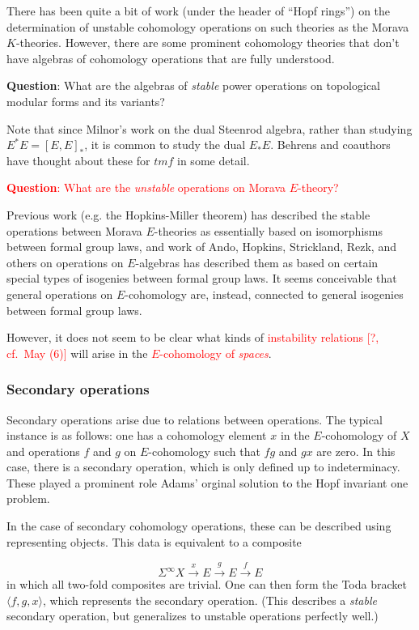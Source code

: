 \documentclass[12pt,titlepage]{article}
\newcommand{\rd}[1]{{\textcolor{red}{#1}}}
\theoremstyle{plain}
\theoremstyle{definition}
\theoremstyle{remark}
\begin{document}
There has been quite a bit of work (under the header of ``{}Hopf rings''{}) on the determination of unstable cohomology operations on such theories as the Morava $K$-theories. However, there are some prominent cohomology theories that don'{}t have algebras of cohomology operations that are fully understood.

\textbf{Question}: What are the algebras of \emph{stable} power operations on topological modular forms and its variants?

Note that since Milnor'{}s work on the dual Steenrod algebra, rather than studying $E^* E = [E,E]_*$, it is common to study the dual $E_*
E$. Behrens and coauthors have thought about these for $tmf$ in some detail.

\rd{\textbf{Question}: What are the \emph{unstable} operations on Morava $E$-theory?}

Previous work (e.g. the Hopkins-Miller theorem) has described the stable operations between Morava $E$-theories as essentially based on isomorphisms between formal group laws, and work of Ando, Hopkins, Strickland, Rezk, and others on operations on $E$-algebras has described them as based on certain special types of isogenies between formal group laws. It seems conceivable that general operations on $E$-cohomology are, instead, connected to general isogenies between formal group laws.

However, it does not seem to be clear what kinds of \rd{instability relations [?, cf.~May (6)]} will arise in the \rd{$E$-cohomology of \emph{spaces}}.

\hypertarget{secondary_operations_3}{}\subsubsection{{Secondary operations}}\label{secondary_operations_3}

Secondary operations arise due to relations between operations. The typical instance is as follows: one has a cohomology element $x$ in the $E$-cohomology of $X$ and operations $f$ and $g$ on $E$-cohomology such that $fg$ and $gx$ are zero. In this case, there is a secondary operation, which is only defined up to indeterminacy. These played a prominent role Adams'{} orginal solution to the Hopf invariant one problem.

In the case of secondary cohomology operations, these can be described using representing objects. This data is equivalent to a composite

\begin{displaymath}
\Sigma^\infty X \stackrel{x}{\to} E \stackrel{g}{\to} E\stackrel{f}{\to} E
\end{displaymath}
in which all two-fold composites are trivial. One can then form the Toda bracket $\langle f,g,x\rangle$, which represents the secondary operation. (This describes a \emph{stable} secondary operation, but generalizes to unstable operations perfectly well.)
\end{document}
